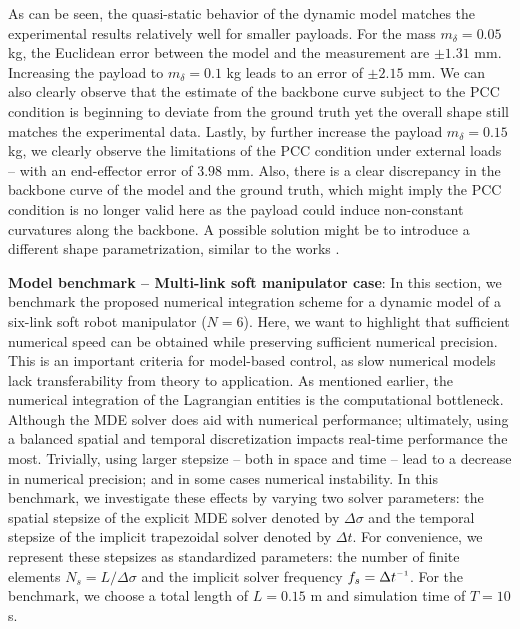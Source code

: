 As can be seen, the quasi-static behavior of the dynamic model matches the experimental results relatively well for smaller payloads. For the mass $m_\delta = 0.05$ kg, the Euclidean error between the model and the measurement are $\pm1.31$ mm. Increasing the payload to $m_\delta = 0.1$ kg leads to an error of $\pm2.15$ mm. We can also clearly observe that the estimate of the backbone curve subject to the PCC condition is beginning to deviate from the ground truth yet the overall shape still matches the experimental data. Lastly, by further increase the payload $m_\delta = 0.15$ kg, we clearly observe the limitations of the PCC condition under external loads -- with an end-effector error of $3.98$ mm. Also, there is a clear discrepancy in the backbone curve of the model and the ground truth, which might imply the PCC condition is no longer valid here as the payload could induce non-constant curvatures along the backbone. A possible solution might be to introduce a different shape parametrization, similar to the works \cite{Chirikjian1994,Boyer2021,Renda2020,DellaSantina2020}.

\textbf{Model benchmark -- Multi-link soft manipulator case}:
\noindent In this section, we benchmark the proposed numerical integration scheme for a dynamic model of a six-link soft robot manipulator ($N = 6$). Here, we want to highlight that sufficient numerical speed can be obtained while preserving sufficient numerical precision. This is an important criteria for model-based control, as slow numerical models lack transferability from theory to application. As mentioned earlier, the numerical integration of the Lagrangian entities is the computational bottleneck. Although the MDE solver does aid with numerical performance; ultimately, using a balanced spatial and temporal discretization impacts real-time performance the most. Trivially, using larger stepsize -- both in space and time -- lead to a decrease in numerical precision; and in some cases numerical instability. In this benchmark, we investigate these effects by varying two solver parameters: the spatial stepsize of the explicit MDE solver denoted by $\Delta \sigma$ and the temporal stepsize of the implicit trapezoidal solver denoted by $\Delta t$. For convenience, we represent these stepsizes as standardized parameters: the number of finite elements $N_s = L/\Delta \sigma$ and the implicit solver frequency $f_s = \Delta t\inv$. For the benchmark, we choose a total length of $L = 0.15$ m and simulation time of $T = 10$ s.

